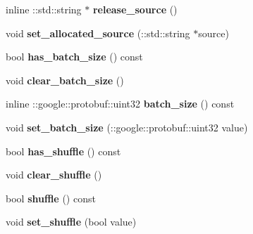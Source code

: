 \begin{DoxyCompactItemize}
inline \+::std\+::string $\ast$ {\bfseries release\+\_\+source} ()
\item 
\mbox{\label{classcaffe_1_1_h_d_f5_data_parameter_afe0924a3b93ddae51d4a361ac6db794c}} 
void {\bfseries set\+\_\+allocated\+\_\+source} (\+::std\+::string $\ast$source)
\item 
\mbox{\label{classcaffe_1_1_h_d_f5_data_parameter_a44a6ce28be7d2c4bb20494bc2e2bd1c0}} 
bool {\bfseries has\+\_\+batch\+\_\+size} () const
\item 
\mbox{\label{classcaffe_1_1_h_d_f5_data_parameter_a22c8f0ad2d38822dcaa33176f61b2da6}} 
void {\bfseries clear\+\_\+batch\+\_\+size} ()
\item 
\mbox{\label{classcaffe_1_1_h_d_f5_data_parameter_a9e07850b134f97849e28ef88d0aac1c9}} 
inline \+::google\+::protobuf\+::uint32 {\bfseries batch\+\_\+size} () const
\item 
\mbox{\label{classcaffe_1_1_h_d_f5_data_parameter_a41a1c4edad04face5b1da544c9be71e6}} 
void {\bfseries set\+\_\+batch\+\_\+size} (\+::google\+::protobuf\+::uint32 value)
\item 
\mbox{\label{classcaffe_1_1_h_d_f5_data_parameter_ada34b6e193ad7ffecf2ca5e82518af64}} 
bool {\bfseries has\+\_\+shuffle} () const
\item 
\mbox{\label{classcaffe_1_1_h_d_f5_data_parameter_a2be8438050b91e6f7237ce333afd4620}} 
void {\bfseries clear\+\_\+shuffle} ()
\item 
\mbox{\label{classcaffe_1_1_h_d_f5_data_parameter_a718e48bd90a927449f2014359051bcf0}} 
bool {\bfseries shuffle} () const
\item 
\mbox{\label{classcaffe_1_1_h_d_f5_data_parameter_a0cf5134fca3dfd203f9c36c1c4b0d817}} 
void {\bfseries set\+\_\+shuffle} (bool value)
\end{DoxyCompactItemize}
